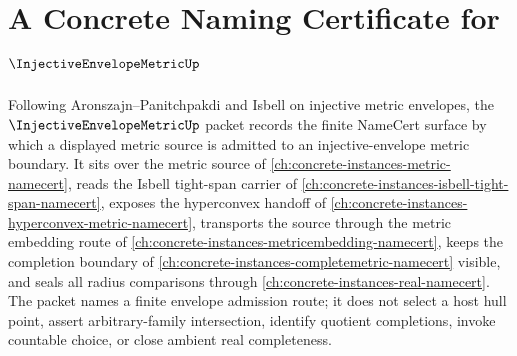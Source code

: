 \chapter{A Concrete Naming Certificate for $\InjectiveEnvelopeMetricUp$}
\label{ch:concrete-instances-injective-envelope-metric-namecert}

Following Aronszajn--Panitchpakdi and Isbell on injective metric envelopes, the $\InjectiveEnvelopeMetricUp$ packet records the finite NameCert surface by which a displayed metric source is admitted to an injective-envelope metric boundary. It sits over the metric source of \autoref{ch:concrete-instances-metric-namecert}, reads the Isbell tight-span carrier of \autoref{ch:concrete-instances-isbell-tight-span-namecert}, exposes the hyperconvex handoff of \autoref{ch:concrete-instances-hyperconvex-metric-namecert}, transports the source through the metric embedding route of \autoref{ch:concrete-instances-metricembedding-namecert}, keeps the completion boundary of \autoref{ch:concrete-instances-completemetric-namecert} visible, and seals all radius comparisons through \autoref{ch:concrete-instances-real-namecert}. The packet names a finite envelope admission route; it does not select a host hull point, assert arbitrary-family intersection, identify quotient completions, invoke countable choice, or close ambient real completeness.

